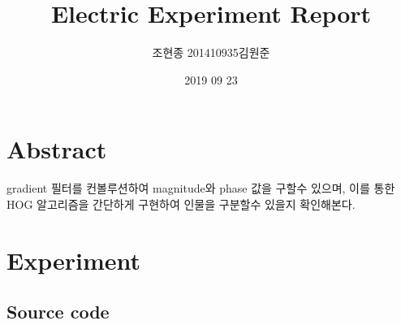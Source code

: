 \documentclass[a4paper]{article}
\begin{document}
\title{Electric Experiment Report}
\author{조현종 201410935 김원준}
\date{2019 09 23}
\maketitle

\section{Abstract}
gradient 필터를 컨볼루션하여 magnitude와 phase 값을 구할수 있으며, 이를 통한 HOG 알고리즘을 간단하게 구현하여 인물을 구분할수 있을지 확인해본다.

\section{Experiment}
\subsection{Source code}
\end{document}
